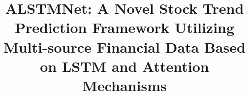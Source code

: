 \documentclass[sn-mathphys]{sn-jnl}%
\theoremstyle{thmstyleone}%
\theoremstyle{thmstyletwo}%
\theoremstyle{thmstylethree}%
\begin{document}
\title[Article Title]{ALSTMNet: A Novel Stock Trend Prediction Framework Utilizing Multi-source Financial Data Based on LSTM and Attention Mechanisms}


\author[]{ }




\end{document}
